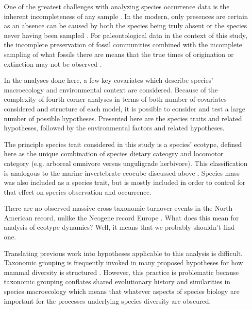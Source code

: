 \documentclass[12pt,letterpaper]{article}
\begin{document}
One of the greatest challenges with analyzing species occurrence data is the inherent incompleteness of any sample \citep{Royle2008,Royle2014,Foote1999a,Foote2001,Lloyd2011,Wang2016b}. In the modern, only presences are certain as an absence can be caused by both the species being truly absent or the species never having been sampled \citep{Royle2008,Royle2014}. For paleontological data in the context of this study, the incomplete preservation of fossil communities combined with the incomplete sampling of what fossils there are means that the true times of origination or extinction may not be observed \citep{Foote1999a,Foote2001,Wang2015,Wang2016b}.



In the analyses done here, a few key covariates which describe species' macroecology and environmental context are considered. Because of the complexity of fourth-corner analyses in terms of both number of covariates considered and structure of each model, it is possible to consider and test a large number of possible hypotheses. Presented here are the species traits and related hypotheses, followed by the environmental factors and related hypotheses.

The principle species trait considered in this study is a species' ecotype, defined here as the unique combination of species dietary cateogry and locomotor category (e.g. arboreal omnivore versus unguligrade herbivore). This classification is analogous to the marine invertebrate ecocube discussed above \citep{Bush2007,Bambach2008,Bush2011}. Species mass was also included as a species trait, but is mostly included in order to control for that effect on species observation and occurrence.

There are no observed massive cross-taxonomic turnover events in the North American record, unlike the Neogene record Europe \citep{Alroy2009,Alroy1996a,Eronen2015,Janis1993b,Alroy2000g}. What does this mean for analysis of ecotype dynamics? Well, it means that we probably shouldn't find one.

Translating previous work into hypotheses applicable to this analysis is difficult. Taxonomic grouping is frequently invoked in many proposed hypotheses for how mammal diversity is structured \citep{Quental2013,Slater2015c,Janis1993c,Pires2015a,Janis2008a}. However, this practice is problematic because taxonomic grouping conflates shared evolutionary history and similarities in species macroecology which means that whatever aspects of species biology are important for the processes underlying species diversity are obscured.
\end{document}
